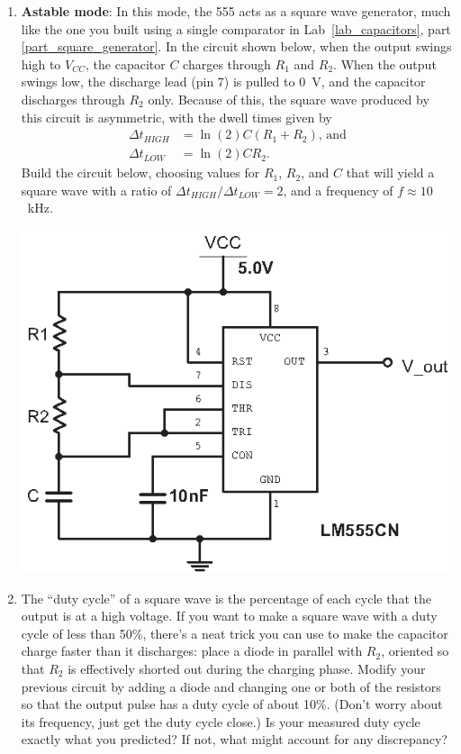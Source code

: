 \begin{enumerate}[wide]
\item \textbf{Astable mode}: In this mode, the 555 acts as a square wave generator, much like the one you built using a single comparator in Lab~\ref{lab_capacitors}, part \ref{part_square_generator}.  In the circuit shown below, when the output swings high to $V_{CC}$, the capacitor $C$ charges through $R_1$ and $R_2$.  When the output swings low, the discharge lead (pin 7) is pulled to 0~V, and the capacitor discharges through $R_2$ only.  Because of this, the square wave produced by this circuit is asymmetric, with the dwell times given by
\begin{align*}
\Delta t_{HIGH} &= \ln (2) C(R_1 + R_2) \textrm{, and} \\
\Delta t_{LOW} &=\ln (2) CR_2.
\end{align*}
Build the circuit below, choosing values for $R_1$, $R_2$, and $C$ that will yield a square wave with a ratio of 
$\Delta t_{HIGH} / \Delta t_{LOW} =2$, and a frequency of $f \approx 10$~kHz. \label{part_astable}
\begin{center}
\includegraphics{timers/astable_555.eps}
\end{center}

\item The ``duty cycle'' of a square wave is the percentage of each cycle that the output is at a high voltage.  If you want to make a square wave with a duty cycle of less than 50\%, there's a neat trick you can use to make the capacitor charge faster than it discharges: place a diode in parallel with $R_2$, oriented so that $R_2$ is effectively shorted out during the charging phase.  Modify your previous circuit by adding a diode and changing one or both of the resistors so that the output pulse has a duty cycle of about 10\%.  (Don't worry about its frequency, just get the duty cycle close.)  Is your measured duty cycle exactly what you predicted?  If not, what might account for any discrepancy?


\end{enumerate}
